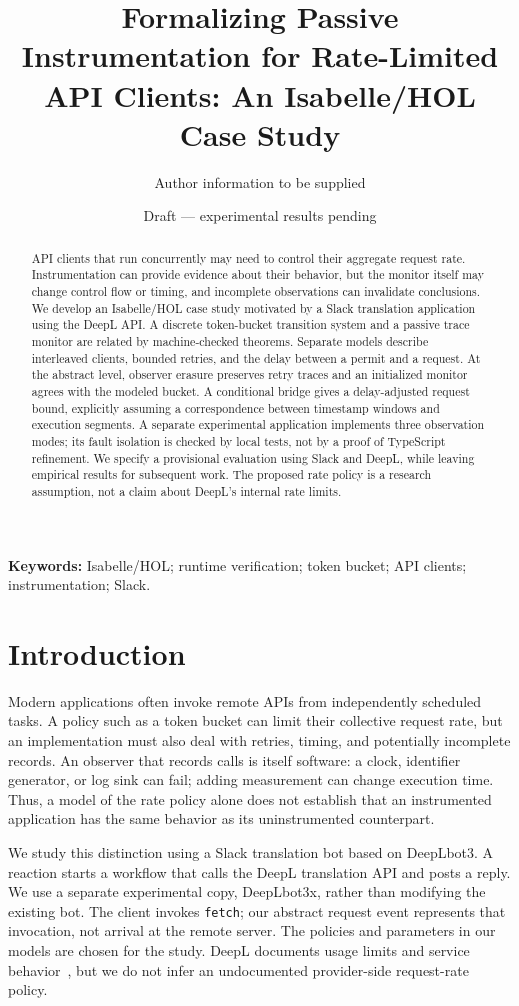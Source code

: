 \documentclass[10pt,twocolumn]{article}
\title{Formalizing Passive Instrumentation for Rate-Limited API Clients: An Isabelle/HOL Case Study}
\author{Author information to be supplied}
\date{Draft --- experimental results pending}
\begin{document}
\maketitle
\begin{abstract}
API clients that run concurrently may need to control their aggregate request rate. Instrumentation can provide evidence about their behavior, but the monitor itself may change control flow or timing, and incomplete observations can invalidate conclusions. We develop an Isabelle/HOL case study motivated by a Slack translation application using the DeepL API. A discrete token-bucket transition system and a passive trace monitor are related by machine-checked theorems. Separate models describe interleaved clients, bounded retries, and the delay between a permit and a request. At the abstract level, observer erasure preserves retry traces and an initialized monitor agrees with the modeled bucket. A conditional bridge gives a delay-adjusted request bound, explicitly assuming a correspondence between timestamp windows and execution segments. A separate experimental application implements three observation modes; its fault isolation is checked by local tests, not by a proof of TypeScript refinement. We specify a provisional evaluation using Slack and DeepL, while leaving empirical results for subsequent work. The proposed rate policy is a research assumption, not a claim about DeepL's internal rate limits.
\end{abstract}
\noindent\textbf{Keywords:} Isabelle/HOL; runtime verification; token bucket; API clients; instrumentation; Slack.

\section{Introduction}
Modern applications often invoke remote APIs from independently scheduled tasks. A policy such as a token bucket can limit their collective request rate, but an implementation must also deal with retries, timing, and potentially incomplete records. An observer that records calls is itself software: a clock, identifier generator, or log sink can fail; adding measurement can change execution time. Thus, a model of the rate policy alone does not establish that an instrumented application has the same behavior as its uninstrumented counterpart.

We study this distinction using a Slack translation bot based on DeepLbot3. A reaction starts a workflow that calls the DeepL translation API and posts a reply. We use a separate experimental copy, DeepLbot3x, rather than modifying the existing bot. The client invokes \texttt{fetch}; our abstract request event represents that invocation, not arrival at the remote server. The policies and parameters in our models are chosen for the study. DeepL documents usage limits and service behavior~\cite{deepllimits}, but we do not infer an undocumented provider-side request-rate policy.
\end{document}
